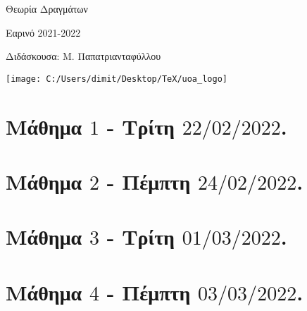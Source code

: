 \documentclass[oneside,a4paper]{article}
\begin{document}
	
	
	\begin{framed}	
		\begin{center}
			\huge Θεωρία Δραγμάτων
		\end{center}
		\begin{center}
			 Εαρινό 2021-2022
		\end{center}
		\vspace{0.3truecm}
		\begin{center}
			Διδάσκουσα: Μ. Παπατριανταφύλλου
		\end{center}
		\vspace{0.3truecm}
	\end{framed}
	\vspace*{\fill}
	\begin{center}
	\texttt{[image: C:/Users/dimit/Desktop/TeX/uoa\_logo]}
	\end{center}
\vspace{1cm}
\pagebreak

\section*{Μάθημα $1$ - Τρίτη $22/02/2022$.}
\vspace{0.3truecm}


\pagebreak


\section*{Μάθημα $2$ - Πέμπτη $24/02/2022$.}
\vspace{0.3truecm}


\pagebreak

\section*{Μάθημα $3$ - Τρίτη $01/03/2022$.}
\vspace{0.3truecm}


\pagebreak

\section*{Μάθημα $4$ - Πέμπτη $03/03/2022$.}
\vspace{0.3truecm}

\end{document}
